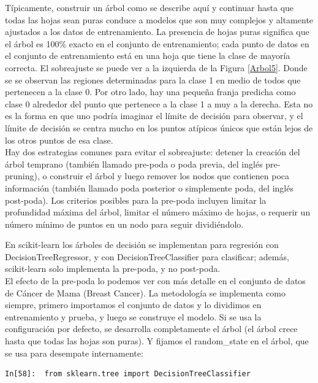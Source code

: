 {Típicamente, construir un árbol como se describe aquí y continuar hasta que todas las hojas sean puras
conduce a modelos que son muy complejos y altamente ajustados a los datos de entrenamiento.  La presencia de hojas puras significa que el árbol es 100\% exacto en el conjunto de entrenamiento; cada punto de datos en el conjunto de entrenamiento está en una hoja que tiene la clase de mayoría correcta.  El sobreajuste se puede ver a la izquierda de la Figura \ref{Arbol5}. Donde se se observan las regiones determinadas para la clase 1 en medio de todos que pertenecen a la clase 0. Por otro lado, hay una pequeña franja predicha como clase 0 alrededor del punto que pertenece a la clase 1 a muy a la derecha. Esta no es la forma en que uno podría imaginar el límite de decisión para observar, y el límite de decisión se centra mucho en los puntos atípicos únicos que están lejos de los otros puntos de esa clase.\\



Hay dos estrategias comunes para evitar el sobreajuste: detener la creación del árbol temprano (también llamado pre-poda o poda previa, del inglés pre-pruning), o construir el árbol y luego  remover los nodos que contienen poca información (también llamado  poda posterior  o simplemente poda, del inglés post-poda). Los criterios posibles para la pre-poda   incluyen limitar la profundidad máxima del árbol, limitar el número máximo de hojas, o requerir un número mínimo de puntos en un nodo para seguir dividiéndolo. 

 En {\ttfamily scikit-learn} los árboles de decisión se implementan para regresión con {\ttfamily DecisionTreeRegressor}, y con {\ttfamily DecisionTreeClassifier} para clasificar; además, scikit-learn solo implementa la  pre-poda, y no post-poda. \\


El efecto de la pre-poda lo podemos ver con más detalle en el conjunto de datos de Cáncer de Mama (Breast Cancer).  La metodología se implementa como siempre, primero importamos el conjunto de datos y lo dividimos en entrenamiento y prueba, y luego se construye el modelo. Si se usa la  configuración por defecto, se  desarrolla completamente el árbol (el árbol crece  hasta que todas las hojas son puras). Y fijamos el {\ttfamily random\_state} en el árbol, que se usa para desempate internamente:\\


\begin{lstlisting}
In[58]:  from sklearn.tree import DecisionTreeClassifier
      

\end{lstlisting}}
